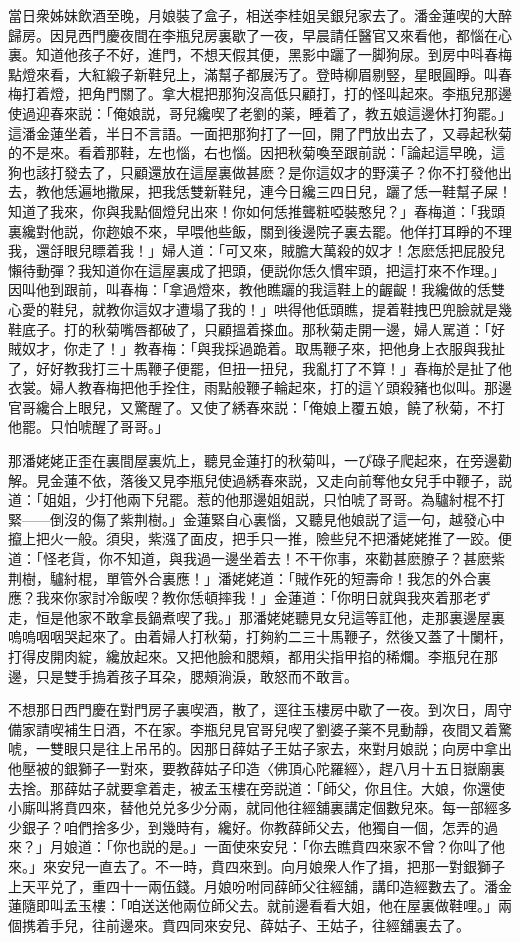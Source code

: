 當日衆姊妹飲酒至晚，月娘裝了盒子，相送李桂姐吴銀兒家去了。潘金蓮喫的大醉歸房。因見西門慶夜間在李瓶兒房裏歇了一夜，早晨請任醫官又來看他，都惱在心裏。知道他孩子不好，進門，不想天假其便，黑影中躧了一脚狗尿。到房中呌春梅點燈來看，大紅緞子新鞋兒上，滿幫子都展汚了。登時柳眉剔竪，星眼圓睜。叫春梅打着燈，把角門關了。拿大棍把那狗沒高低只顧打，打的怪叫起來。李瓶兒那邊使過迎春來説：「俺娘説，哥兒纔喫了老劉的薬，睡着了，教五娘這邊休打狗罷。」這潘金蓮坐着，半日不言語。一面把那狗打了一回，開了門放出去了，又尋起秋菊的不是來。看着那鞋，左也惱，右也惱。因把秋菊喚至跟前説：「論起這早晚，這狗也該打發去了，只顧還放在這屋裏做甚麽？是你這奴才的野漢子？你不打發他出去，教他恁遍地撒屎，把我恁雙新鞋兒，連今日纔三四日兒，躧了恁一鞋幫子屎！知道了我來，你與我點個燈兒出來！你如何恁推聾粧啞裝憨兒？」春梅道：「我頭裏纔對他説，你趂娘不來，早喂他些飯，關到後邊院子裏去罷。他佯打耳睜的不理我，還㧱眼兒瞟着我！」婦人道：「可又來，賊膽大萬殺的奴才！怎麽恁把屁股兒懶待動彈？我知道你在這屋裏成了把頭，便説你恁久慣牢頭，把這打來不作理。」因叫他到跟前，叫春梅：「拿過燈來，教他瞧躧的我這鞋上的齷齪！我纔做的恁雙心愛的鞋兒，就教你這奴才遭塌了我的！」哄得他低頭瞧，提着鞋拽巴兜臉就是幾鞋底子。打的秋菊嘴唇都破了，只顧搵着搽血。那秋菊走開一邊，婦人駡道：「好賊奴才，你走了！」教春梅：「與我採過跪着。取馬鞭子來，把他身上衣服與我扯了，好好教我打三十馬鞭子便罷，但扭一扭兒，我亂打了不算！」春梅於是扯了他衣裳。婦人教春梅把他手拴住，雨點般鞭子輪起來，打的這丫頭殺豬也似叫。那邊官哥纔合上眼兒，又驚醒了。又使了綉春來説：「俺娘上覆五娘，饒了秋菊，不打他罷。只怕唬醒了哥哥。」

那潘姥姥正歪在裏間屋裏炕上，聽見金蓮打的秋菊叫，一ぴ碌子爬起來，在旁邊勸解。見金蓮不依，落後又見李瓶兒使過綉春來説，又走向前奪他女兒手中鞭子，説道：「姐姐，少打他兩下兒罷。惹的他那邊姐姐説，只怕唬了哥哥。為驢紂棍不打緊——倒沒的傷了紫荆樹。」金蓮緊自心裏惱，又聽見他娘説了這一句，越發心中攛上把火一般。須臾，紫漒了面皮，把手只一推，險些兒不把潘姥姥推了一跤。便道：「怪老貨，你不知道，與我過一邊坐着去！不干你事，來勸甚麽膫子？甚麽紫荆樹，驢紂棍，單管外合裏應！」潘姥姥道：「賊作死的短壽命！我怎的外合裏應？我來你家討冷飯喫？教你恁頓摔我！」金蓮道：「你明日就與我夾着那老ず走，恒是他家不敢拿長鍋煮喫了我。」那潘姥姥聽見女兒這等訌他，走那裏邊屋裏嗚嗚咽咽哭起來了。由着婦人打秋菊，打夠約二三十馬鞭子，然後又蓋了十闌杆，打得皮開肉綻，纔放起來。又把他臉和腮頰，都用尖指甲掐的稀爛。李瓶兒在那邊，只是雙手摀着孩子耳朶，腮頰淌淚，敢怒而不敢言。

不想那日西門慶在對門房子裏喫酒，散了，逕往玉樓房中歇了一夜。到次日，周守備家請喫補生日酒，不在家。李瓶兒見官哥兒喫了劉婆子薬不見動靜，夜間又着驚唬，一雙眼只是往上吊吊的。因那日薛姑子王姑子家去，來對月娘説；向房中拿出他壓被的銀獅子一對來，要教薛姑子印造〈佛頂心陀羅經〉，趕八月十五日嶽廟裏去捨。那薛姑子就要拿着走，被孟玉樓在旁説道：「師父，你且住。大娘，你還使小廝叫將賁四來，替他兑兑多少分兩，就同他往經舖裏講定個數兒來。每一部經多少銀子？咱們捨多少，到幾時有，纔好。你教薛師父去，他獨自一個，怎弄的過來？」月娘道：「你也説的是。」一面使來安兒：「你去瞧賁四來家不曾？你叫了他來。」來安兒一直去了。不一時，賁四來到。向月娘衆人作了揖，把那一對銀獅子上天平兑了，重四十一兩伍錢。月娘吩咐同薛師父往經舖，講印造經數去了。潘金蓮隨即叫孟玉樓：「咱送送他兩位師父去。就前邊看看大姐，他在屋裏做鞋哩。」兩個携着手兒，往前邊來。賁四同來安兒、薛姑子、王姑子，往經舖裏去了。

